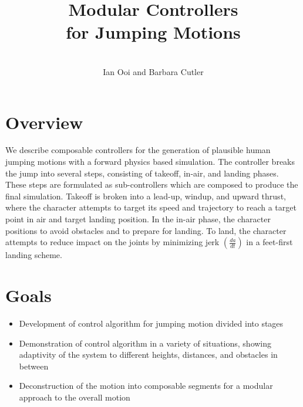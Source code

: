 \documentclass[landscape,26pt]{sciposter}
\title{ Modular Controllers \\for Jumping Motions}
\author{\ \\ Ian Ooi and Barbara Cutler}
\institute{Department of Computer Science\\
           Rensselaer Polytechnic Institute\\}
\begin{document}


\maketitle

\begin{minipage}[t]{10.5in}
	\section*{Overview}
		We describe composable controllers for the generation of plausible human jumping motions with a forward physics based simulation.  The controller breaks the jump into several steps, consisting of takeoff, in-air, and landing phases.  These steps are formulated as sub-controllers which are composed to produce the final simulation.  Takeoff is broken into a lead-up, windup, and upward thrust, where the character attempts to target its speed and trajectory to reach a target point in air and target landing position.  In the in-air phase, the character positions to avoid obstacles and to prepare for landing.  To land, the character attempts to reduce impact on the joints by minimizing jerk $(\frac{da}{dt})$ in a feet-first landing scheme.

		\vspace{.3in}
	\section*{Goals}
		\begin{itemize}
			\item Development of control algorithm for jumping motion divided into stages 
			\item Demonstration of control algorithm in a variety of situations, showing adaptivity of the system to different heights, distances, and obstacles in between
			\item Deconstruction of the motion into composable segments for a modular approach to the overall motion
		\end{itemize}

		\vspace{.3in}


\end{minipage}
\end{document}
